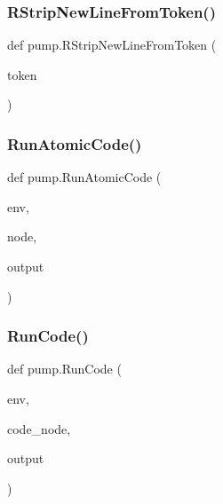 \mbox{\label{namespacepump_ae07150d94399cbe1661abe5929f921e0}} 
\subsubsection{\texorpdfstring{R\+Strip\+New\+Line\+From\+Token()}{RStripNewLineFromToken()}}
{\footnotesize\ttfamily def pump.\+R\+Strip\+New\+Line\+From\+Token (\begin{DoxyParamCaption}\item[{}]{token }\end{DoxyParamCaption})}

\mbox{\label{namespacepump_a901e6abd34691a0d779178a615cc09c1}} 
\subsubsection{\texorpdfstring{Run\+Atomic\+Code()}{RunAtomicCode()}}
{\footnotesize\ttfamily def pump.\+Run\+Atomic\+Code (\begin{DoxyParamCaption}\item[{}]{env,  }\item[{}]{node,  }\item[{}]{output }\end{DoxyParamCaption})}

\mbox{\label{namespacepump_ac6a714a44e28c2a19a1dfabeb9c9d4f1}} 
\subsubsection{\texorpdfstring{Run\+Code()}{RunCode()}}
{\footnotesize\ttfamily def pump.\+Run\+Code (\begin{DoxyParamCaption}\item[{}]{env,  }\item[{}]{code\+\_\+node,  }\item[{}]{output }\end{DoxyParamCaption})}

\mbox{\label{namespacepump_a869bd8932d9ee97f3a0e789abd05d590}} 
